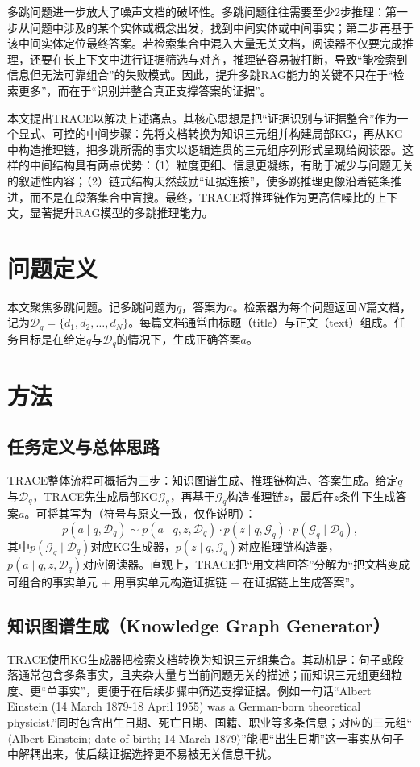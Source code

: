 多跳问题进一步放大了噪声文档的破坏性。多跳问题往往需要至少2步推理：第一步从问题中涉及的某个实体或概念出发，找到中间实体或中间事实；第二步再基于该中间实体定位最终答案。若检索集合中混入大量无关文档，阅读器不仅要完成推理，还要在长上下文中进行证据筛选与对齐，推理链容易被打断，导致“能检索到信息但无法可靠组合”的失败模式。因此，提升多跳RAG能力的关键不只在于“检索更多”，而在于“识别并整合真正支撑答案的证据”。

本文提出TRACE以解决上述痛点。其核心思想是把“证据识别与证据整合”作为一个显式、可控的中间步骤：先将文档转换为知识三元组并构建局部KG，再从KG中构造推理链，把多跳所需的事实以逻辑连贯的三元组序列形式呈现给阅读器。这样的中间结构具有两点优势：（1）粒度更细、信息更凝练，有助于减少与问题无关的叙述性内容；（2）链式结构天然鼓励“证据连接”，使多跳推理更像沿着链条推进，而不是在段落集合中盲搜。最终，TRACE将推理链作为更高信噪比的上下文，显著提升RAG模型的多跳推理能力。

\section{问题定义}
本文聚焦多跳问题。记多跳问题为$q$，答案为$a$。检索器为每个问题返回$N$篇文档，记为$\mathcal{D}_q=\{d_1,d_2,\dots,d_N\}$。每篇文档通常由标题（title）与正文（text）组成。任务目标是在给定$q$与$\mathcal{D}_q$的情况下，生成正确答案$a$。

\section{方法}
\subsection{任务定义与总体思路}
TRACE整体流程可概括为三步：知识图谱生成、推理链构造、答案生成。给定$q$与$\mathcal{D}_q$，TRACE先生成局部KG$\mathcal{G}_q$，再基于$\mathcal{G}_q$构造推理链$z$，最后在$z$条件下生成答案$a$。可将其写为（符号与原文一致，仅作说明）：
\[
p(a\mid q,\mathcal{D}_q)\sim p(a\mid q,z,\mathcal{D}_q)\cdot p(z\mid q,\mathcal{G}_q)\cdot p(\mathcal{G}_q\mid \mathcal{D}_q),
\]
其中$p(\mathcal{G}_q\mid \mathcal{D}_q)$对应KG生成器，$p(z\mid q,\mathcal{G}_q)$对应推理链构造器，$p(a\mid q,z,\mathcal{D}_q)$对应阅读器。直观上，TRACE把“用文档回答”分解为“把文档变成可组合的事实单元 + 用事实单元构造证据链 + 在证据链上生成答案”。

\subsection{知识图谱生成（Knowledge Graph Generator）}
TRACE使用KG生成器把检索文档转换为知识三元组集合。其动机是：句子或段落通常包含多条事实，且夹杂大量与当前问题无关的描述；而知识三元组更细粒度、更“单事实”，更便于在后续步骤中筛选支撑证据。例如一句话“Albert Einstein (14 March 1879-18 April 1955) was a German-born theoretical physicist.”同时包含出生日期、死亡日期、国籍、职业等多条信息；对应的三元组“$\langle$Albert Einstein; date of birth; 14 March 1879$\rangle$”能把“出生日期”这一事实从句子中解耦出来，使后续证据选择更不易被无关信息干扰。

